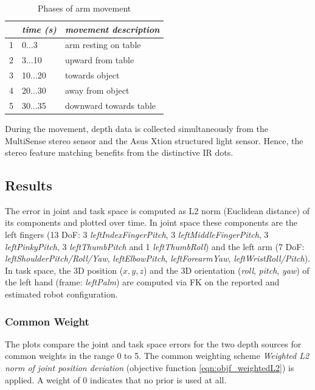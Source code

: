 \begin{table}
\centering
\begin{tabular}{|c|l|l|}
\hline
 & \emph{time (s)} & \emph{movement description} \\
\hline
1 & 0$\dots$3 & arm resting on table \\
\hline
2 & 3$\dots$10 & upward from table \\
\hline
3 & 10$\dots$20 & towards object \\
\hline
4 & 20$\dots$30 & away from object \\
\hline
5 & 30$\dots$35 & downward towards table \\
\hline
\end{tabular}
\caption{Phases of arm movement}
\label{tab:prior_movement_phases}
\end{table}

During the movement, depth data is collected simultaneously from the MultiSense stereo sensor and the Asus Xtion structured light sensor. Hence, the stereo feature matching benefits from the distinctive IR dots.

\subsection{Results}
\label{sec:prior_results}

The error in joint and task space is computed as L2 norm (Euclidean distance) of its components and plotted over time. In joint space these components are the left fingers (13 DoF: 3 \emph{leftIndexFingerPitch}, 3 \emph{leftMiddleFingerPitch}, 3 \emph{leftPinkyPitch}, 3 \emph{leftThumbPitch} and 1 \emph{leftThumbRoll}) and the left arm (7 DoF: \emph{leftShoulderPitch/Roll/Yaw}, \emph{leftElbowPitch}, \emph{leftForearmYaw}, \emph{leftWristRoll/Pitch}). In task space, the 3D position ($x,y,z$) and the 3D orientation (\textit{roll}, \textit{pitch}, \textit{yaw}) of the left hand (frame: \emph{leftPalm}) are computed via FK on the reported and estimated robot configuration.

\subsubsection{Common Weight}

The plots compare the joint and task space errors for the two depth sources for common weights in the range 0 to 5. The common weighting scheme \emph{Weighted L2 norm of joint position deviation} (objective function \cref{eqn:objf_weightedL2}) is applied. A weight of 0 indicates that no prior is used at all.

